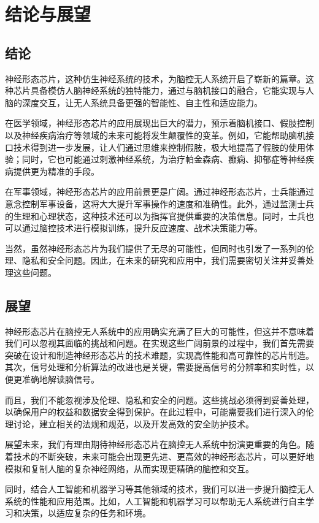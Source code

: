 \documentclass{thuemp}
\begin{document}
\section{结论与展望}
\subsection{结论}
神经形态芯片，这种仿生神经系统的技术，为脑控无人系统开启了崭新的篇章。这种芯片具备模仿人脑神经系统的独特能力，通过与脑机接口的融合，它能实现与人脑的深度交互，让无人系统具备更强的智能性、自主性和适应能力。

在医学领域，神经形态芯片的应用展现出巨大的潜力，预示着脑机接口、假肢控制以及神经疾病治疗等领域的未来可能将发生颠覆性的变革。例如，它能帮助脑机接口技术得到进一步发展，让人们通过思维来控制假肢，极大地提高了假肢的使用体验；同时，它也可能通过刺激神经系统，为治疗帕金森病、癫痫、抑郁症等神经疾病提供更为精准的手段。

在军事领域，神经形态芯片的应用前景更是广阔。通过神经形态芯片，士兵能通过意念控制军事设备，这将大大提升军事操作的速度和准确性。此外，通过监测士兵的生理和心理状态，这种技术还可以为指挥官提供重要的决策信息。同时，士兵也可以通过脑控技术进行模拟训练，提升反应速度、战术决策能力等。

当然，虽然神经形态芯片为我们提供了无尽的可能性，但同时也引发了一系列的伦理、隐私和安全问题。因此，在未来的研究和应用中，我们需要密切关注并妥善处理这些问题。

\subsection{展望}
神经形态芯片在脑控无人系统中的应用确实充满了巨大的可能性，但这并不意味着我们可以忽视其面临的挑战和问题。在实现这些广阔前景的过程中，我们首先需要突破在设计和制造神经形态芯片的技术难题，实现高性能和高可靠性的芯片制造。其次，信号处理和分析算法的改进也是关键，需要提高信号的分辨率和实时性，以便更准确地解读脑信号。

而且，我们不能忽视涉及伦理、隐私和安全的问题。这些挑战必须得到妥善处理，以确保用户的权益和数据安全得到保护。在此过程中，可能需要我们进行深入的伦理讨论，建立相关的法规和规范，以及开发高效的安全防护技术。

展望未来，我们有理由期待神经形态芯片在脑控无人系统中扮演更重要的角色。随着技术的不断突破，未来可能会出现更先进、更高效的神经形态芯片，可以更好地模拟和复制人脑的复杂神经网络，从而实现更精确的脑控和交互。

同时，结合人工智能和机器学习等其他领域的技术，我们可以进一步提升脑控无人系统的性能和应用范围。比如，人工智能和机器学习可以帮助无人系统进行自主学习和决策，以适应复杂的任务和环境。
\end{document}
